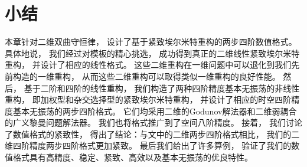 \section{小结}

本章针对二维双曲守恒律，
设计了基于紧致埃尔米特重构的两步四阶数值格式。
具体地说，
我们经过对模板的精心挑选，
成功得到真正的二维线性紧致埃尔米特重构，
并设计了相应的线性格式。
这些二维重构在一维问题中可以退化到我们先前构造的一维重构，
从而这些二维重构可以取得类似一维重构的良好性能。
然后，
基于二阶和四阶的线性重构，
我们构造了两种四阶精度基本无振荡的非线性重构，
即加权型和杂交选择型的紧致埃尔米特重构，
并设计了相应的时空四阶精度基本无振荡的两步四阶格式。
它们均采用二维的Godunov解法器和二维弱耦合的广义黎曼问题解法器。
我们也将格式推广到了空间八阶精度。
接着，
我们讨论了数值格式的紧致性，
得出了结论：与文\cite{du2018hermite}中的二维两步四阶格式相比，
我们的二维四阶精度两步四阶格式更加紧致。
最后我们给出了许多算例，
验证了我们的数值格式具有高精度、稳定、紧致、高效以及基本无振荡的优良特性。